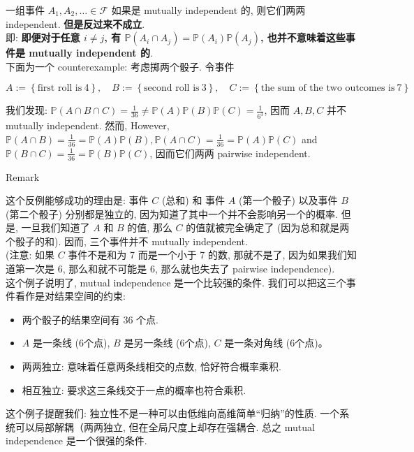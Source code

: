\documentclass{qlnotes-export}
\begin{document}
\begin{example}

一组事件 \(A_{1},A_{2},\ldots \in \mathcal{F}\) 如果是 mutually independent 的, 则它们两两 independent. \textbf{但是反过来不成立}.\\
即: \textbf{即便对于任意 \(i \neq j\), 有 \({\mathbb{P}}(A_{i} \cap A_{j}) = {\mathbb{P}}(A_{i}){\mathbb{P}}(A_{j})\), 也并不意味着这些事件是 mutually independent 的}.\\
下面为一个 counterexample: 考虑掷两个骰子. 令事件

\[A := \left\{ {\text{first roll is}\ 4} \right\},\quad B := \left\{ {\text{second roll is}\ 3} \right\},\quad C := \left\{ {\text{the sum of the two outcomes is}\ 7} \right\}\]

我们发现: \({\mathbb{P}}(A \cap B \cap C) = \frac{1}{36} \neq {\mathbb{P}}(A){\mathbb{P}}(B){\mathbb{P}}(C) = \frac{1}{6^{3}}\), 因而 \(A,B,C\) 并不 mutually independent. 然而, However, \({\mathbb{P}}(A \cap B) = \frac{1}{36} = {\mathbb{P}}(A){\mathbb{P}}(B),{\mathbb{P}}(A \cap C) = \frac{1}{36} = {\mathbb{P}}(A){\mathbb{P}}(C)\) and \({\mathbb{P}}(B \cap C) = \frac{1}{36} = {\mathbb{P}}(B){\mathbb{P}}(C)\), 因而它们两两 pairwise independent.

\end{example}

\begin{qlremark}{Remark}

这个反例能够成功的理由是: 事件 \(C\) (总和) 和 事件 \(A\) (第一个骰子) 以及事件 \(B\) (第二个骰子) 分别都是独立的, 因为知道了其中一个并不会影响另一个的概率. 但是, 一旦我们知道了 \(A\) 和 \(B\) 的值, 那么 \(C\) 的值就被完全确定了 (因为总和就是两个骰子的和). 因而, 三个事件并不 mutually independent.\\
(注意: 如果 \(C\) 事件不是和为 7 而是一个小于 7 的数, 那就不是了, 因为如果我们知道第一次是 6, 那么和就不可能是 6, 那么就也失去了 pairwise independence).\\
这个例子说明了, mutual independence 是一个比较强的条件. 我们可以把这三个事件看作是对结果空间的约束:

\begin{itemize}
\item
  两个骰子的结果空间有 36 个点.
\item
  \(A\) 是一条线 (6个点), \(B\) 是另一条线 (6个点), \(C\) 是一条对角线 (6个点)。
\item
  两两独立: 意味着任意两条线相交的点数, 恰好符合概率乘积.
\item
  相互独立: 要求这三条线交于一点的概率也符合乘积.
\end{itemize}

这个例子提醒我们: 独立性不是一种可以由低维向高维简单``归纳''的性质. 一个系统可以局部解耦（两两独立, 但在全局尺度上却存在强耦合. 总之 mutual independence 是一个很强的条件.

\end{qlremark}
\end{document}
